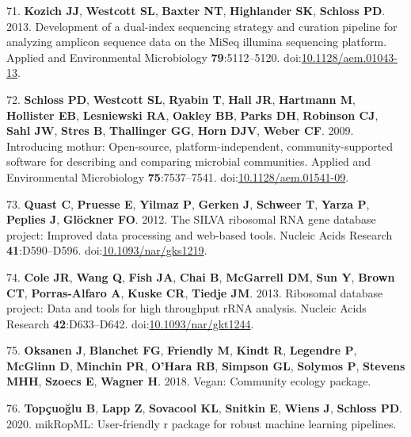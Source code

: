 \documentclass[
  11pt,
]{article}
\begin{document}
\leavevmode\hypertarget{ref-Kozich2013}{}%
71. \textbf{Kozich JJ}, \textbf{Westcott SL}, \textbf{Baxter NT},
\textbf{Highlander SK}, \textbf{Schloss PD}. 2013. Development of a
dual-index sequencing strategy and curation pipeline for analyzing
amplicon sequence data on the MiSeq illumina sequencing platform.
Applied and Environmental Microbiology \textbf{79}:5112--5120.
doi:\href{https://doi.org/10.1128/aem.01043-13}{10.1128/aem.01043-13}.

\leavevmode\hypertarget{ref-Schloss2009}{}%
72. \textbf{Schloss PD}, \textbf{Westcott SL}, \textbf{Ryabin T},
\textbf{Hall JR}, \textbf{Hartmann M}, \textbf{Hollister EB},
\textbf{Lesniewski RA}, \textbf{Oakley BB}, \textbf{Parks DH},
\textbf{Robinson CJ}, \textbf{Sahl JW}, \textbf{Stres B},
\textbf{Thallinger GG}, \textbf{Horn DJV}, \textbf{Weber CF}. 2009.
Introducing mothur: Open-source, platform-independent,
community-supported software for describing and comparing microbial
communities. Applied and Environmental Microbiology
\textbf{75}:7537--7541.
doi:\href{https://doi.org/10.1128/aem.01541-09}{10.1128/aem.01541-09}.

\leavevmode\hypertarget{ref-Quast2012}{}%
73. \textbf{Quast C}, \textbf{Pruesse E}, \textbf{Yilmaz P},
\textbf{Gerken J}, \textbf{Schweer T}, \textbf{Yarza P}, \textbf{Peplies
J}, \textbf{Glöckner FO}. 2012. The SILVA ribosomal RNA gene database
project: Improved data processing and web-based tools. Nucleic Acids
Research \textbf{41}:D590--D596.
doi:\href{https://doi.org/10.1093/nar/gks1219}{10.1093/nar/gks1219}.

\leavevmode\hypertarget{ref-Cole2013}{}%
74. \textbf{Cole JR}, \textbf{Wang Q}, \textbf{Fish JA}, \textbf{Chai
B}, \textbf{McGarrell DM}, \textbf{Sun Y}, \textbf{Brown CT},
\textbf{Porras-Alfaro A}, \textbf{Kuske CR}, \textbf{Tiedje JM}. 2013.
Ribosomal database project: Data and tools for high throughput rRNA
analysis. Nucleic Acids Research \textbf{42}:D633--D642.
doi:\href{https://doi.org/10.1093/nar/gkt1244}{10.1093/nar/gkt1244}.

\leavevmode\hypertarget{ref-Vegan2018}{}%
75. \textbf{Oksanen J}, \textbf{Blanchet FG}, \textbf{Friendly M},
\textbf{Kindt R}, \textbf{Legendre P}, \textbf{McGlinn D},
\textbf{Minchin PR}, \textbf{O'Hara RB}, \textbf{Simpson GL},
\textbf{Solymos P}, \textbf{Stevens MHH}, \textbf{Szoecs E},
\textbf{Wagner H}. 2018. Vegan: Community ecology package.

\leavevmode\hypertarget{ref-mikropml}{}%
76. \textbf{Topçuoğlu B}, \textbf{Lapp Z}, \textbf{Sovacool KL},
\textbf{Snitkin E}, \textbf{Wiens J}, \textbf{Schloss PD}. 2020.
mikRopML: User-friendly r package for robust machine learning pipelines.
\end{document}
